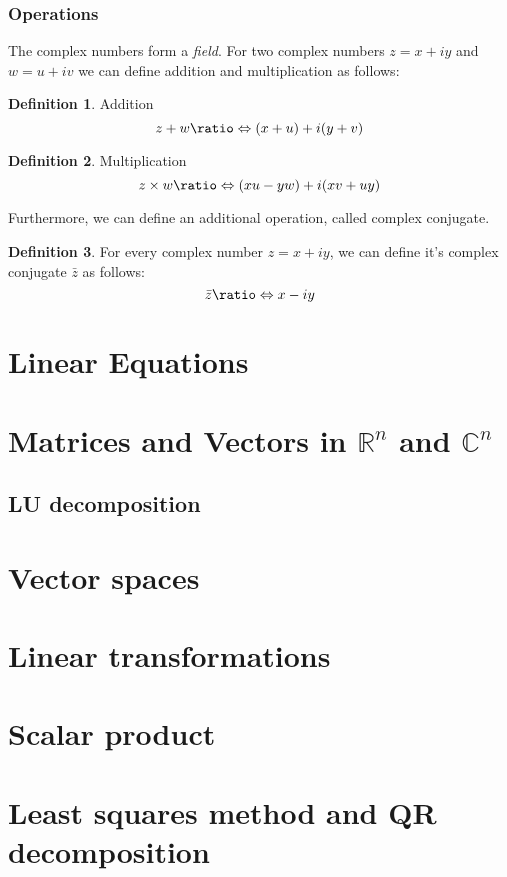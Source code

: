 \documentclass[a4paper,12pt]{article}
\newcommand{\uniti}{i}
\newcommand{\defas}{\ratio\Leftrightarrow}
\newcommand{\conj}[1]{\bar{#1}}
\theoremstyle{definition}
\newtheorem{defn}{Definition}[section]
\begin{document}
\subsubsection{Operations}

The complex numbers form a \textit{field}. For two complex numbers
$ z = x + \uniti y $ and $ w = u + \uniti v $ we can define
addition and multiplication as follows:

\begin{defn} Addition
    $$ z + w \defas (x + u) + \uniti (y + v) $$
\end{defn}
\begin{defn} Multiplication
    $$ z \times w \defas (xu - yw) + \uniti (xv + uy) $$
\end{defn}

Furthermore, we can define an additional operation, called complex conjugate.

\begin{defn}
    For every complex number $z = x + \uniti y$,
    we can define it's complex conjugate $\conj{z}$ as follows:
    $$ \conj{z} \defas x - \uniti y $$
\end{defn}

\section{Linear Equations}

\section{Matrices and Vectors in $\mathbb{R}^{n}$ and $\mathbb{C}^{n}$}

\subsection{LU decomposition}

\section{Vector spaces}

\section{Linear transformations}

\section{Scalar product}

\section{Least squares method and QR decomposition}
\end{document}
